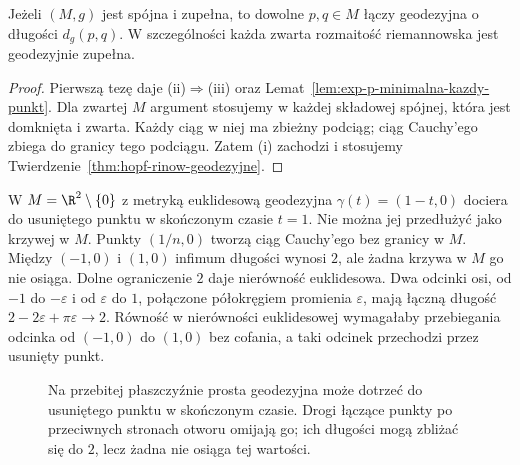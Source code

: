 \begin{wniosek}
\label{cor:hopf-rinow-minimalna}
Jeżeli $(M,g)$ jest spójna i zupełna, to
dowolne $p,q\in M$ łączy geodezyjna
o długości $d_g(p,q)$. W szczególności
każda zwarta rozmaitość riemannowska
jest geodezyjnie zupełna.
\end{wniosek}
\begin{proof}
Pierwszą tezę daje (ii)$\Rightarrow$(iii)
oraz Lemat~\ref{lem:exp-p-minimalna-kazdy-punkt}.
Dla zwartej $M$ argument stosujemy w każdej składowej
spójnej, która jest domknięta i zwarta. Każdy ciąg w niej
ma zbieżny podciąg; ciąg Cauchy'ego zbiega
do granicy tego podciągu. Zatem (i) zachodzi
i stosujemy Twierdzenie~\ref{thm:hopf-rinow-geodezyjne}.
\end{proof}

\begin{przyklad}
W $M=\R^2\setminus\{0\}$ z metryką euklidesową
geodezyjna $\gamma(t)=(1-t,0)$ dociera do
usuniętego punktu w skończonym czasie $t=1$.
Nie można jej przedłużyć jako krzywej w $M$.
Punkty $(1/n,0)$ tworzą ciąg Cauchy'ego bez
granicy w $M$. Między $(-1,0)$ i $(1,0)$
infimum długości wynosi $2$, ale żadna krzywa
w $M$ go nie osiąga. Dolne ograniczenie $2$ daje
nierówność euklidesowa. Dwa odcinki osi, od $-1$ do
$-\varepsilon$ i od $\varepsilon$ do $1$, połączone
półokręgiem promienia $\varepsilon$, mają łączną długość
$2-2\varepsilon+\pi\varepsilon\to2$.
Równość w nierówności euklidesowej wymagałaby przebiegania
odcinka od $(-1,0)$ do $(1,0)$ bez cofania, a taki odcinek
przechodzi przez usunięty punkt.
\end{przyklad}

\begin{figure}[htbp]
\centering
{}
\caption{Na przebitej płaszczyźnie prosta geodezyjna może dotrzeć do usuniętego punktu w skończonym czasie. Drogi łączące punkty po przeciwnych stronach otworu omijają go; ich długości mogą zbliżać się do $2$, lecz żadna nie osiąga tej wartości.}
\label{fig:geodezyjna-przebita-plaszczyzna}
\end{figure}

